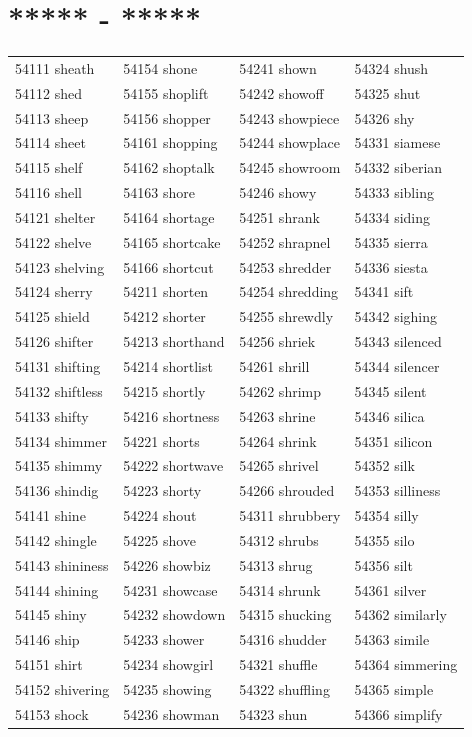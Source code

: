 \documentclass[10pt, oneside]{book}
\begin{document}
\begin{table}[h]
	\centering
	\section*{***** - *****}
	\begin{tabular}{l l l l}
54111 sheath &54154 shone &54241 shown &54324 shush\\
54112 shed &54155 shoplift &54242 showoff &54325 shut\\
54113 sheep &54156 shopper &54243 showpiece &54326 shy\\
54114 sheet &54161 shopping &54244 showplace &54331 siamese\\
54115 shelf &54162 shoptalk &54245 showroom &54332 siberian\\
54116 shell &54163 shore &54246 showy &54333 sibling\\
54121 shelter &54164 shortage &54251 shrank &54334 siding\\
54122 shelve &54165 shortcake &54252 shrapnel &54335 sierra\\
54123 shelving &54166 shortcut &54253 shredder &54336 siesta\\
54124 sherry &54211 shorten &54254 shredding &54341 sift\\
54125 shield &54212 shorter &54255 shrewdly &54342 sighing\\
54126 shifter &54213 shorthand &54256 shriek &54343 silenced\\
54131 shifting &54214 shortlist &54261 shrill &54344 silencer\\
54132 shiftless &54215 shortly &54262 shrimp &54345 silent\\
54133 shifty &54216 shortness &54263 shrine &54346 silica\\
54134 shimmer &54221 shorts &54264 shrink &54351 silicon\\
54135 shimmy &54222 shortwave &54265 shrivel &54352 silk\\
54136 shindig &54223 shorty &54266 shrouded &54353 silliness\\
54141 shine &54224 shout &54311 shrubbery &54354 silly\\
54142 shingle &54225 shove &54312 shrubs &54355 silo\\
54143 shininess &54226 showbiz &54313 shrug &54356 silt\\
54144 shining &54231 showcase &54314 shrunk &54361 silver\\
54145 shiny &54232 showdown &54315 shucking &54362 similarly\\
54146 ship &54233 shower &54316 shudder &54363 simile\\
54151 shirt &54234 showgirl &54321 shuffle &54364 simmering\\
54152 shivering &54235 showing &54322 shuffling &54365 simple\\
54153 shock &54236 showman &54323 shun &54366 simplify\\
	\end{tabular}
 \end{table}
\end{document}
